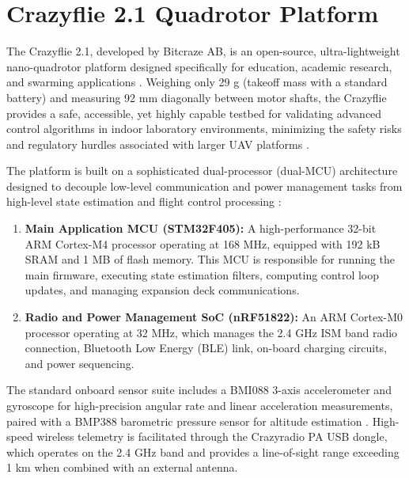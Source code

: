 \section{Crazyflie 2.1 Quadrotor Platform}
The Crazyflie 2.1, developed by Bitcraze AB, is an open-source, ultra-lightweight nano-quadrotor platform designed specifically for education, academic research, and swarming applications \cite{ref_13, ref_14}. Weighing only 29 g (takeoff mass with a standard battery) and measuring 92 mm diagonally between motor shafts, the Crazyflie provides a safe, accessible, yet highly capable testbed for validating advanced control algorithms in indoor laboratory environments, minimizing the safety risks and regulatory hurdles associated with larger UAV platforms \cite{ref_36, ref_38}.

The platform is built on a sophisticated dual-processor (dual-MCU) architecture designed to decouple low-level communication and power management tasks from high-level state estimation and flight control processing \cite{ref_37}:
\begin{enumerate}
    \item \textbf{Main Application MCU (STM32F405):} A high-performance 32-bit ARM Cortex-M4 processor operating at 168 MHz, equipped with 192 kB SRAM and 1 MB of flash memory. This MCU is responsible for running the main firmware, executing state estimation filters, computing control loop updates, and managing expansion deck communications.
    \item \textbf{Radio and Power Management SoC (nRF51822):} An ARM Cortex-M0 processor operating at 32 MHz, which manages the 2.4 GHz ISM band radio connection, Bluetooth Low Energy (BLE) link, on-board charging circuits, and power sequencing.
\end{enumerate}

The standard onboard sensor suite includes a BMI088 3-axis accelerometer and gyroscope for high-precision angular rate and linear acceleration measurements, paired with a BMP388 barometric pressure sensor for altitude estimation \cite{ref_38}. High-speed wireless telemetry is facilitated through the Crazyradio PA USB dongle, which operates on the 2.4 GHz band and provides a line-of-sight range exceeding 1 km when combined with an external antenna.

